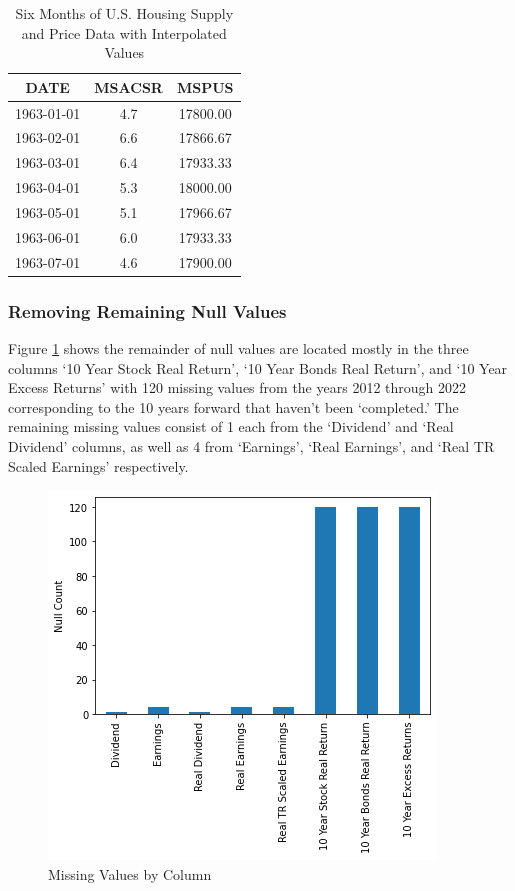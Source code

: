 \documentclass [MS] {uclathes}
\begin{document}
\begin{table}[H]
\centering
\renewcommand{\arraystretch}{0.75}
\caption{Six Months of U.S. Housing Supply and Price Data with Interpolated Values}
\label{tab:After_Interpolation}
\begin{tabular}{c|c|c} \hline
\textbf{DATE}   & \textbf{MSACSR}     & \textbf{MSPUS}  \\ 
\hline \hline
1963-01-01      & 4.7                 & 17800.00        \\
1963-02-01      & 6.6                 & 17866.67        \\
1963-03-01      & 6.4                 & 17933.33        \\
1963-04-01      & 5.3                 & 18000.00        \\
1963-05-01      & 5.1                 & 17966.67        \\
1963-06-01      & 6.0                 & 17933.33        \\
1963-07-01      & 4.6                 & 17900.00        \\
\hline
\end{tabular}
\end{table}

\subsubsection{Removing Remaining Null Values}

Figure \ref{fig:null_count_by_column} shows the remainder of null values are located mostly in the three columns `10 Year Stock Real Return', `10 Year Bonds Real Return', and `10 Year Excess Returns' with 120 missing values from the years 2012 through 2022 corresponding to the 10 years forward that haven't been `completed.' The remaining missing values consist of 1 each from the `Dividend' and `Real Dividend' columns, as well as 4 from `Earnings', `Real Earnings', and `Real TR Scaled Earnings' respectively.

\begin{figure}[h!]
    \centering
    \includegraphics[scale=0.75]{figures/null_count_by_column.png}
    \caption{Missing Values by Column}
    \label{fig:null_count_by_column}
\end{figure}
\end{document}

